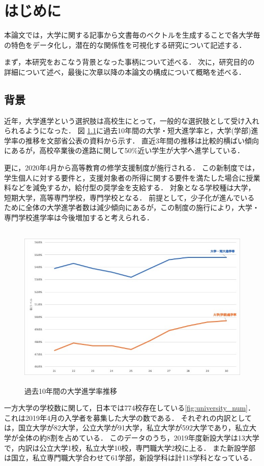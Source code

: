\chapter{はじめに}
本論文では，大学に関する記事から文書毎のベクトルを生成することで各大学毎の特色をデータ化し，潜在的な関係性を可視化する研究について記述する．

まず，本研究をおこなう背景となった事柄について述べる．
次に，研究目的の詳細について述べ，最後に次章以降の本論文の構成について概略を述べる．

\section{背景}
近年，大学進学という選択肢は高校生にとって，一般的な選択肢として受け入れられるようになった．
図 \ref{fig:univ_continuance_rate}に過去10年間の大学・短大進学率と，大学(学部)進学率の推移を文部省公表の資料\cite{univContinuanceRate}から示す．  
直近3年間の推移は比較的横ばい傾向にあるが，高校卒業後の進路に関して50\%近い学生が大学へ進学している．

更に，2020年4月から高等教育の修学支援制度\cite{Shingakusyusienseido}が施行される．
この新制度では，学生個人に対する要件と，支援対象者の所得に関する要件を満たした場合に授業料などを減免するか，給付型の奨学金を支給する．
対象となる学校種は大学，短期大学，高等専門学校，専門学校となる．
前提として，少子化が進んでいるために全体の大学進学者数は減少傾向にあるが，この制度の施行により，大学・専門学校進学率は今後増加すると考えられる．  
\begin{figure}[H]
\centering
\includegraphics[height=8cm]{images/univ_continuance_rate.jpg}
\caption{過去10年間の大学進学率推移}
\label{fig:univ_continuance_rate}
\end{figure}

一方大学の学校数に関して，日本では774校存在している\ref{fig:university_num}．これは2019年4月の入学者を募集した大学の数である．
それぞれの内訳としては，国立大学が82大学，公立大学が91大学，私立大学が592大学であり，私立大学が全体の約8割を占めている．
このデータのうち，2019年度新設大学は13大学で，内訳は公立大学1校，私立大学10校，専門職大学2校に上る．
また新設学部は国立，私立専門職大学合わせて61学部，新設学科は計118学科となっている．

